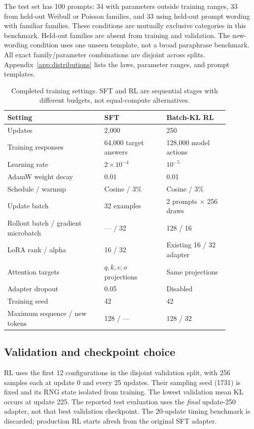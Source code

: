 \documentclass[11pt,letterpaper]{article}
\begin{document}
The test set has 100 prompts: 34 with parameters outside training ranges,
33 from held-out Weibull or Poisson families, and 33 using held-out prompt
wording with familiar families. These conditions are mutually exclusive
categories in this benchmark. Held-out families are absent from training and
validation. The new-wording condition uses one unseen template, not a broad
paraphrase benchmark. All exact family/parameter combinations are disjoint
across splits. Appendix~\ref{app:distributions} lists the laws, parameter
ranges, and prompt templates.

\begin{table}[t]
\centering\small
\caption{Completed training settings. SFT and RL are sequential stages with
different budgets, not equal-compute alternatives.}
\label{tab:settings}
\begin{tabular}{@{}p{0.39\linewidth}p{0.25\linewidth}p{0.25\linewidth}@{}}
\toprule
Setting & SFT & Batch-KL RL\\
\midrule
Updates & 2,000 & 250\\
Training responses & 64,000 target answers & 128,000 model actions\\
Learning rate & $2\times10^{-4}$ & $10^{-5}$\\
AdamW weight decay & 0.01 & 0.01\\
Schedule / warmup & Cosine / 3\% & Cosine / 3\%\\
Update batch & 32 examples & 2 prompts $\times$ 256 draws\\
Rollout batch / gradient microbatch & --- / 32 & 128 / 16\\
LoRA rank / alpha & 16 / 32 & Existing 16 / 32 adapter\\
Attention targets & $q,k,v,o$ projections & Same projections\\
Adapter dropout & 0.05 & Disabled\\
Training seed & 42 & 42\\
Maximum sequence / new tokens & 128 / --- & 128 / 32\\
\bottomrule
\end{tabular}
\end{table}

\subsection{Validation and checkpoint choice}
RL uses the first 12 configurations in the disjoint validation split, with
256 samples each at update 0 and every 25 updates. Their sampling seed
(1731) is fixed and its RNG state isolated from training. The lowest
validation mean KL occurs at update 225. The reported test evaluation uses
the \emph{final} update-250 adapter, not that best validation checkpoint.
The 20-update timing benchmark is discarded; production RL starts afresh
from the original SFT adapter.
\end{document}
